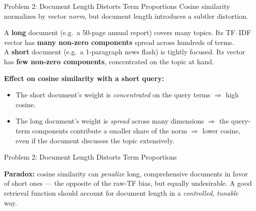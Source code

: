 \documentclass[aspectratio=169]{beamer}
\begin{document}
%
%
\begin{frame}{Problem 2: Document Length Distorts Term Proportions}
\small
Cosine similarity normalizes by vector \emph{norm},
but document length introduces a subtler distortion.

\medskip

\begin{tcolorbox}[colback=red!5!white, colframe=red!70!black,
  title=\textbf{The vocabulary-breadth effect}]
A \textbf{long} document (e.g.\ a 50-page annual report)
covers many topics.  Its TF--IDF vector has \textbf{many non-zero
components} spread across hundreds of terms.\\[4pt]
A \textbf{short} document (e.g.\ a 1-paragraph news flash)
is tightly focused.  Its vector has
\textbf{few non-zero components},
concentrated on the topic at hand.
\end{tcolorbox}

\medskip
\textbf{Effect on cosine similarity with a short query:}

\begin{itemize}
\item The short document's weight is \emph{concentrated}
      on the query terms $\Rightarrow$ high cosine.
\item The long document's weight is \emph{spread}
      across many dimensions $\Rightarrow$ the query-term components
      contribute a smaller share of the norm
      $\Rightarrow$ lower cosine, even if the document discusses
      the topic extensively.
\end{itemize}
\end{frame}
%
%
\begin{frame}{Problem 2: Document Length Distorts Term Proportions}
\begin{tcolorbox}[colback=gray!8, colframe=gray!60]
\textbf{Paradox:} cosine similarity can \emph{penalize} long,
comprehensive documents in favor of short ones ---
the opposite of the raw-TF bias, but equally undesirable.
A good retrieval function should account for document length
in a \emph{controlled, tunable} way.
\end{tcolorbox}

\end{frame}
%
%
\end{document}
